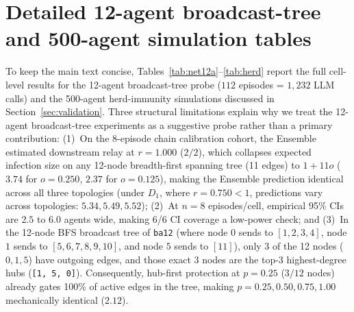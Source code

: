 \documentclass[preprint,12pt,authoryear]{elsarticle}
\begin{document}
\section{Detailed 12-agent broadcast-tree and 500-agent simulation tables}
\label{app:tables}

To keep the main text concise, Tables~\ref{tab:net12a}--\ref{tab:herd} report the full cell-level results for the 12-agent broadcast-tree probe ($112$ episodes = $1{,}232$ LLM calls) and the 500-agent herd-immunity simulations discussed in Section~\ref{sec:validation}. Three structural limitations explain why we treat the 12-agent broadcast-tree experiments as a suggestive probe rather than a primary contribution:
(1)~On the 8-episode chain calibration cohort, the Ensemble estimated downstream relay at $r = 1.000$ ($2/2$), which collapses expected infection size on any 12-node breadth-first spanning tree (11 edges) to $1 + 11o$ ($3.74$ for $o=0.250$, $2.37$ for $o=0.125$), making the Ensemble prediction identical across all three topologies (under $D_1$, where $r = 0.750 < 1$, predictions vary across topologies: $5.34, 5.49, 5.52$);
(2)~At $n=8$ episodes/cell, empirical 95\% CIs are $2.5$ to $6.0$ agents wide, making 6/6 CI coverage a low-power check; and
(3)~In the 12-node BFS broadcast tree of \texttt{ba12} (where node $0$ sends to $[1,2,3,4]$, node $1$ sends to $[5,6,7,8,9,10]$, and node $5$ sends to $[11]$), only 3 of the 12 nodes ($0, 1, 5$) have outgoing edges, and those exact 3 nodes are the top-3 highest-degree hubs (\texttt{[1, 5, 0]}). Consequently, hub-first protection at $p = 0.25$ ($3/12$ nodes) already gates 100\% of active edges in the tree, making $p = 0.25, 0.50, 0.75, 1.00$ mechanically identical ($2.12$).
\end{document}
